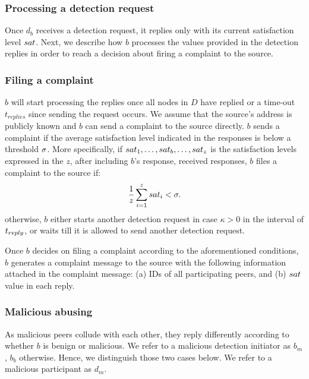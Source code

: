 \subsubsection*{Processing a detection request}
Once $d_b$ receives a detection request, it replies only with its current satisfaction level $sat$.
Next, we describe how $b$ processes the values provided in the detection replies in order to reach a decision about firing a complaint to the source.

\subsubsection*{Filing a complaint}

$b$ will start processing the replies once all nodes in $D$ have replied or a time-out $t_{replies}$ since sending the request occurs. 
We assume that the source's address is publicly known and $b$ can send a complaint to the source directly.
$b$ sends a complaint if the average satisfaction level indicated in the responses is below a threshold $\sigma$.
More specifically, if $sat_1, \ldots , sat_b, \ldots ,sat_z$ is the satisfaction levels expressed in the $z$, after including $b$'s response, received responses,
$b$ files a complaint to the source if:
\begin{align}
\label{eq:drop_satis_equation}
\frac{1}{z}\sum_{i=1}^{z} \sat_i< \satThres. 
\end{align} 
otherwise, $b$ either starts another detection request in case $\kappa >0$ in the interval of $t_{reply}$, or waits till it is allowed to send another detection request.

Once $b$ decides on filing a complaint according to the aforementioned conditions, $b$ generates a complaint message to the source with the following information attached in the complaint message: 
(a) IDs of all participating peers, and (b) $sat$ value in each reply.

\subsubsection*{Malicious abusing}

As malicious peers collude with each other, they reply differently according to whether $b$ is benign or malicious.
We refer to a malicious detection initiator as $b_m$, $b_b$ otherwise.
Hence, we distinguish those two cases below. We refer to a malicious participant as $d_m$.

